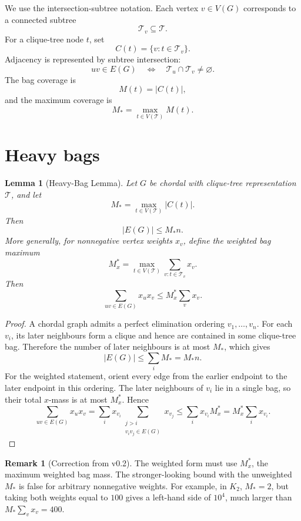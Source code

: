 \documentclass[11pt]{article}
\newtheorem{lemma}[theorem]{Lemma}
\theoremstyle{definition}
\newtheorem{remark}[theorem]{Remark}
\newcommand{\calT}{\mathcal T}
\begin{document}
We use the intersection-subtree notation. Each vertex \(v\in V(G)\) corresponds to a connected subtree
\[
    \calT_v\subseteq \calT.
\]
For a clique-tree node \(t\), set
\[
    C(t)=\{v:t\in\calT_v\}.
\]
Adjacency is represented by subtree intersection:
\[
    uv\in E(G)
    \quad\Longleftrightarrow\quad
    \calT_u\cap\calT_v\neq\varnothing.
\]
The bag coverage is
\[
    M(t)=|C(t)|,
\]
and the maximum coverage is
\[
    M_*=
    \max_{t\in V(\calT)}M(t).
\]

\section{Heavy bags}

\begin{lemma}[Heavy-Bag Lemma]\label{lem:heavy-bag}
Let \(G\) be chordal with clique-tree representation \(\calT\), and let
\[
    M_*=
    \max_{t\in V(\calT)} |C(t)|.
\]
Then
\[
    |E(G)|\le M_* n.
\]
More generally, for nonnegative vertex weights \(x_v\), define the weighted bag maximum
\[
    M_x^*
    =
    \max_{t\in V(\calT)}
    \sum_{v:t\in\calT_v}x_v.
\]
Then
\[
    \sum_{uv\in E(G)}x_ux_v
    \le
    M_x^*\sum_vx_v.
\]
\end{lemma}

\begin{proof}
A chordal graph admits a perfect elimination ordering \(v_1,\ldots,v_n\). For each \(v_i\), its later neighbours form a clique and hence are contained in some clique-tree bag. Therefore the number of later neighbours is at most \(M_*\), which gives
\[
    |E(G)|
    \le
    \sum_i M_*
    =
    M_*n.
\]
For the weighted statement, orient every edge from the earlier endpoint to the later endpoint in this ordering. The later neighbours of \(v_i\) lie in a single bag, so their total \(x\)-mass is at most \(M_x^*\). Hence
\[
    \sum_{uv\in E(G)}x_ux_v
    =
    \sum_i x_{v_i}
    \sum_{\substack{j>i\\v_iv_j\in E(G)}}x_{v_j}
    \le
    \sum_i x_{v_i}M_x^*
    =
    M_x^*\sum_i x_{v_i}.
\]
\end{proof}

\begin{remark}[Correction from v0.2]
The weighted form must use \(M_x^*\), the maximum weighted bag mass. The stronger-looking bound with the unweighted \(M_*\) is false for arbitrary nonnegative weights. For example, in \(K_2\), \(M_*=2\), but taking both weights equal to \(100\) gives a left-hand side of \(10^4\), much larger than \(M_*\sum_vx_v=400\).
\end{remark}
\end{document}
